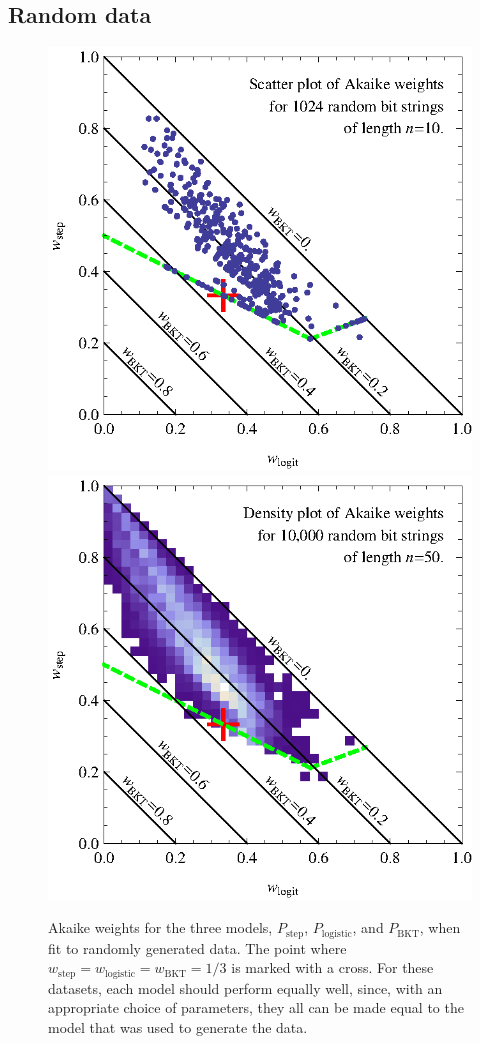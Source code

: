 \documentclass{edm_template}
\begin{document}
\subsection{Random data}


\begin{figure}
  \includegraphics{scatter10.eps} \hfill
  \includegraphics{density50.eps}
  \caption{Akaike weights for the three models, 
   $P_\mathrm{step}$, $P_\mathrm{logistic}$, and $P_\mathrm{BKT}$, 
   when fit to randomly generated data.  The point where
   $w_\mathrm{step}=w_\mathrm{logistic}=w_\mathrm{BKT}=1/3$ is
   marked with a cross.  For these datasets, each 
   model should perform equally well, since, with an appropriate
   choice of parameters, they all can be made equal to 
   the model that was used to generate the data.}\label{scatter2}
\end{figure}
\end{document}
